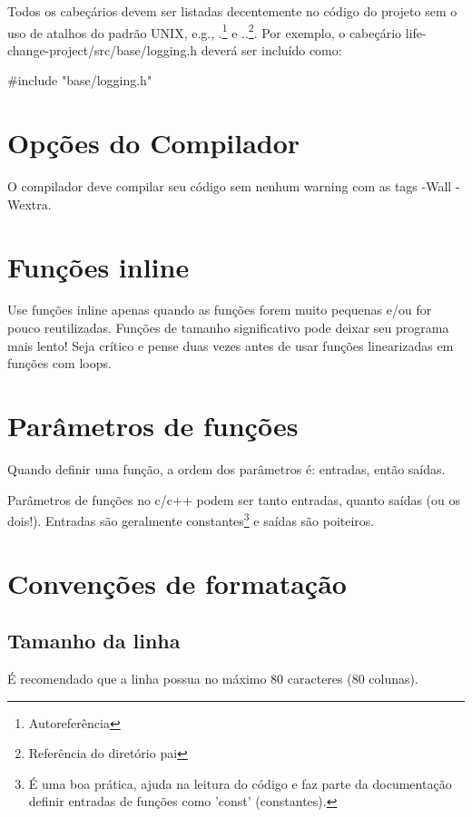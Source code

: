 \documentclass{article}
\begin{document}
Todos os cabeçários devem ser listadas decentemente no código do projeto sem o uso de atalhos do padrão UNIX, e.g., .\footnote{Autoreferência} e ..\footnote{Referência do diretório pai}. Por exemplo, o cabeçário life-change-project/src/base/logging.h deverá ser incluído como:

\begin{code}
#include "base/logging.h"
\end{code}

\section{Opções do Compilador}

O compilador deve compilar seu código sem nenhum warning com as tags -Wall -Wextra.

\section{Funções inline}

Use funções inline apenas quando as funções forem muito pequenas e/ou for pouco reutilizadas. Funções de tamanho significativo pode deixar seu programa mais lento! Seja crítico e pense duas vezes antes de usar funções linearizadas em funções com loops.

\section{Parâmetros de funções}

Quando definir uma função, a ordem dos parâmetros é: entradas, então saídas.

Parâmetros de funções no c/c++ podem ser tanto entradas, quanto saídas (ou os dois!). Entradas são geralmente constantes\footnote{É uma boa prática, ajuda na leitura do código e faz parte da documentação definir entradas de funções como 'const' (constantes).} e saídas são poiteiros. 

\section{Convenções de formatação}
\subsection{Tamanho da linha}
É recomendado que a linha possua no máximo 80 caracteres (80 colunas).
\end{document}
